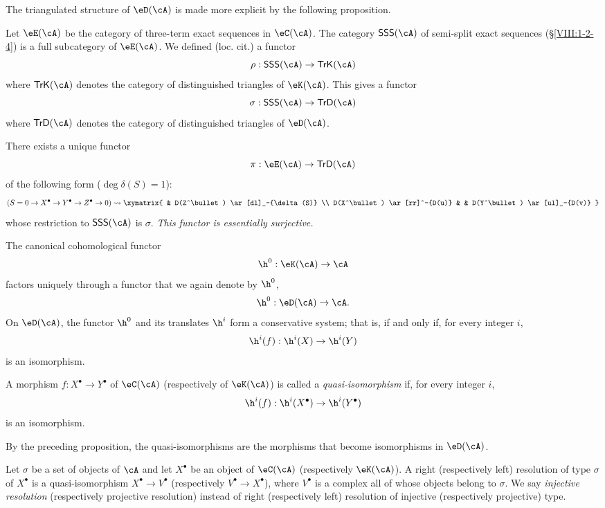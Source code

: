 The triangulated structure of $\eD(\cA)$ is made more explicit by the
following proposition.

Let $\eE(\cA)$ be the category of three-term exact sequences in
$\eC(\cA)$. The category $\mathsf{SSS}(\cA)$ of semi-split exact
sequences (\S\ref{VIII:1-2-4}) is a full subcategory of $\eE(\cA)$.
We defined (loc. cit.) a functor
\[
  \rho:\mathsf{SSS}(\cA) \to \mathsf{TrK}(\cA)
\]
where $\mathsf{TrK}(\cA)$ denotes the category of distinguished triangles
of $\eK(\cA)$. This gives a functor
\[
  \sigma : \mathsf{SSS}(\cA) \to \mathsf{TrD}(\cA)
\]
where $\mathsf{TrD}(\cA)$ denotes the category of distinguished triangles
of $\eD(\cA)$.

\begin{proposition}\label{VIII:3-1-5}
There exists a unique functor
\[
  \pi:\eE(\cA) \to \mathsf{TrD}(\cA)
\]
of the following form ($\deg \delta(S)=1$):
\[
(S=0 \to X^\bullet \to Y^\bullet \to Z^\bullet \to 0)
\leadsto
\xymatrix{
  & D(Z^\bullet) \ar[dl]_-{\delta(S)} \\
  D(X^\bullet) \ar[rr]^-{D(u)}
    & & D(Y^\bullet) \ar[ul]_-{D(v)}
}
\]
whose restriction to $\mathsf{SSS}(\cA)$ is $\sigma$. \emph{This functor
is essentially surjective.}
\end{proposition}

\begin{proposition}\label{VIII:3-1-6}
The canonical cohomological functor
\[
  \h^0:\eK(\cA) \to \cA
\]
factors uniquely through a functor that we again denote by $\h^0$,
\[
  \h^0:\eD(\cA) \to \cA \text{.}
\]
On $\eD(\cA)$, the functor $\h^0$ and its translates $\h^i$ form a
conservative system; that is,  if and only if, for every integer $i$,
\[
  \h^i(f):\h^i(X) \to \h^i(Y)
\]
is an isomorphism.
\end{proposition}

\begin{definition}\label{VIII:3-1-7}
A morphism $f:X^\bullet \to Y^\bullet$ of $\eC(\cA)$ (respectively of
$\eK(\cA)$) is called a \emph{quasi-isomorphism} if, for every integer
$i$,
\[
  \h^i(f):\h^i(X^\bullet) \to \h^i(Y^\bullet)
\]
is an isomorphism.
\end{definition}

By the preceding proposition, the quasi-isomorphisms are the morphisms
that become isomorphisms in $\eD(\cA)$.

\begin{definition}\label{VIII:3-1-8}
Let $\sigma$ be a set of objects of $\cA$ and let $X^\bullet$ be an
object of $\eC(\cA)$ (respectively $\eK(\cA)$). A right (respectively
left) resolution of type $\sigma$ of $X^\bullet$ is a quasi-isomorphism
$X^\bullet \to V^\bullet$ (respectively $V^\bullet \to X^\bullet$), where
$V^\bullet$ is a complex all of whose objects belong to $\sigma$. We say
\emph{injective resolution} (respectively projective resolution) instead
of right (respectively left) resolution of injective (respectively
projective) type.
\end{definition}

